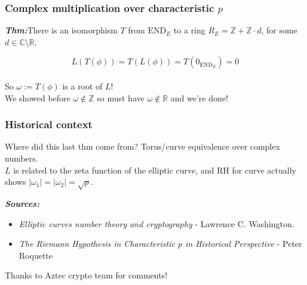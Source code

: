 \documentclass[shadesubsections,compress,14pt,mathserif]{beamer}
\newcommand{\defeq}{\ensuremath{:=}}
\newcommand{\hl}[1]{\textbf{\textit{#1}}}
\newcommand{\nl}{\\ \pause \vspace{0.2in}}
\begin{document}
\begin{frame}
\frametitle{Complex multiplication over characteristic $p$}
\hl{Thm:}There is an isomorphism $T$ from
 $\mathrm{END}_E$ to a ring
$R_E = \mathbb{Z}+\mathbb{Z}\cdot d$, for some $d\in \mathbb{C}\setminus \mathbb{R}$.\nl

\[L(T(\phi))=T(L(\phi))=T(0_{\mathrm{END}_E})=0\]\nl
So $\omega\defeq T(\phi)$ is a root of $L$!\nl
We showed before $\omega \notin \mathbb{Z}$ so must have 
$\omega\notin \mathbb{R}$ and we're done!
\end{frame}
\begin{frame}
\frametitle{Historical context}
Where did this last thm come from?
Torus/curve equivalence over complex numbers.\nl
$L$ is related to the zeta function of the elliptic curve, and RH for curve actually shows
$|\omega_1|=|\omega_2|=\sqrt p$. 

\end{frame}



\begin{frame}
 \hl{Sources:}
 \begin{itemize}
  \item 

 \emph{Elliptic curves number theory and cryptography} - Lawrence C. Washington.
  \item 
 \emph{The Riemann Hypothesis in Characteristic $p$ in Historical Perspective} - Peter Roquette
 \end{itemize}
 \vspace{0.5in}
  Thanks to Aztec crypto team for comments!
\end{frame}










\end{document}

